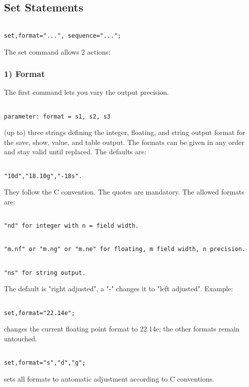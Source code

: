 



\subsection{Set Statements}
\begin{verbatim}

set,format="...", sequence="...";
\end{verbatim} The set command allows 2 actions: 

\subsubsection{1) Format} The first command lets you vary the output precision. 
\begin{verbatim}

parameter: format = s1, s2, s3
\end{verbatim} (up to) three strings defining the integer, floating, and string output format for the save, show, value, and table output. The formats can be given in any order and stay valid until replaced. The defaults are: 
\begin{verbatim}

"10d","18.10g","-18s".
\end{verbatim} They follow the C convention. The quotes are mandatory. The allowed formats are: 
\begin{verbatim}

"nd" for integer with n = field width.
\end{verbatim}
\begin{verbatim}

"m.nf" or "m.ng" or "m.ne" for floating, m field width, n precision.
\end{verbatim}
\begin{verbatim}

"ns" for string output.
\end{verbatim} The default is "right adjusted", a "-" changes it to "left adjusted".  Example: 
\begin{verbatim}

set,format="22.14e";
\end{verbatim} changes the current floating point format to 22.14e; the other formats remain untouched. 
\begin{verbatim}

set,format="s","d","g";
\end{verbatim} sets all formats to automatic adjustment according to C conventions. 

